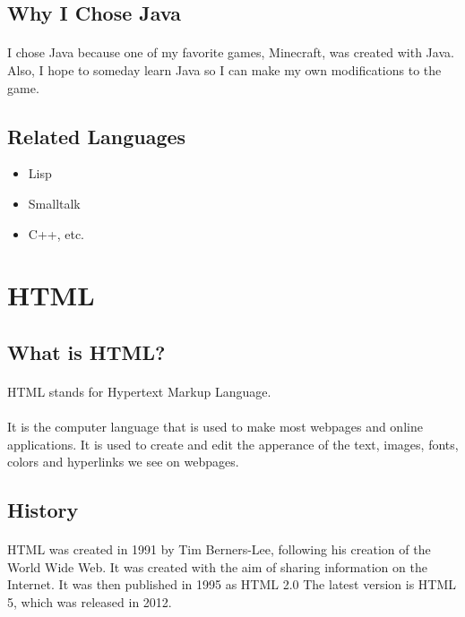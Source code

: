 \documentclass{article}
\begin{document}
	\subsection*{Why I Chose Java}
	\paragraph{}I chose Java because one of my favorite games, Minecraft, was created with Java.
	Also, I hope to someday learn Java so I can make my own modifications to the game.
	\subsection*{Related Languages}
	\begin{itemize}
		\item Lisp
		\item Smalltalk
		\item C++, etc.
	\end{itemize}

\section*{HTML}
\subsection*{What is HTML?}
\paragraph{}HTML stands for Hypertext Markup Language.
\paragraph{}It is the computer language that is used to make most webpages and online applications.
It is used to create and edit the apperance of the text, images, fonts, colors and hyperlinks we see on webpages.
\subsection*{History}
\paragraph{}HTML was created in 1991 by Tim Berners-Lee, following his creation of the World Wide Web.
It was created with the aim of sharing information on the Internet.
It was then published in 1995 as HTML 2.0
The latest version is HTML 5, which was released in 2012.
\end{document}
